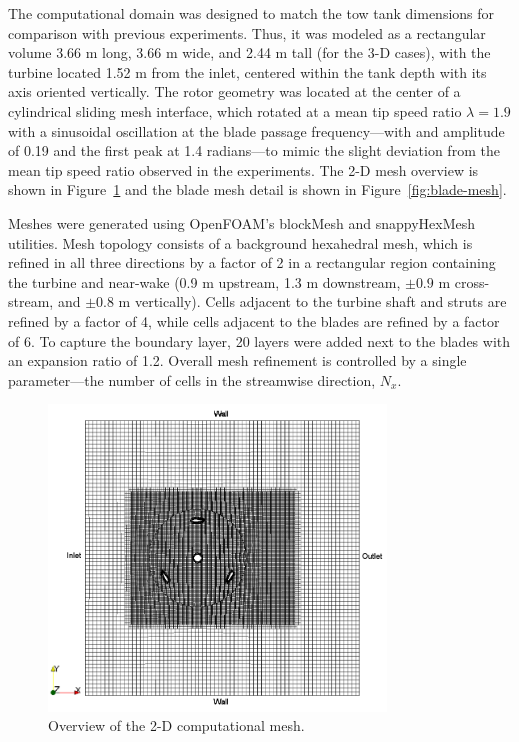 \documentclass[aip,graphicx]{revtex4-1}
\begin{document}
The computational domain was designed to match the tow tank dimensions for
comparison with previous experiments. Thus, it was modeled as a rectangular
volume 3.66 m long, 3.66 m wide, and 2.44 m tall (for the 3-D cases), with the
turbine located 1.52 m from the inlet, centered within the tank depth with its
axis oriented vertically. The rotor geometry was located at the center of a
cylindrical sliding mesh interface, which rotated at a mean tip speed ratio
$\lambda=1.9$ with a sinusoidal oscillation at the blade passage
frequency---with and amplitude of 0.19 and the first peak at 1.4 radians---to
mimic the slight deviation from the mean tip speed ratio observed in the
experiments. The 2-D mesh overview is shown in Figure~\ref{fig:2d-br-mesh} and
the blade mesh detail is shown in Figure~\ref{fig:blade-mesh}.

Meshes were generated using OpenFOAM's blockMesh and snappyHexMesh utilities.
Mesh topology consists of a background hexahedral mesh, which is refined in all
three directions by a factor of 2 in a rectangular region containing the turbine
and near-wake (0.9 m upstream, 1.3 m downstream, $\pm 0.9$ m cross-stream, and
$\pm 0.8$ m vertically). Cells adjacent to the turbine shaft and struts are
refined by a factor of 4, while cells adjacent to the blades are refined by a
factor of 6. To capture the boundary layer, 20 layers were added next to the
blades with an expansion ratio of 1.2. Overall mesh refinement is controlled by
a single parameter---the number of cells in the streamwise direction, $N_x$.

\begin{figure}
    \centering

    \includegraphics[width=0.8\textwidth]{2D_mesh}

    \caption{Overview of the 2-D computational mesh.}

    \label{fig:2d-br-mesh}
\end{figure}
\end{document}
